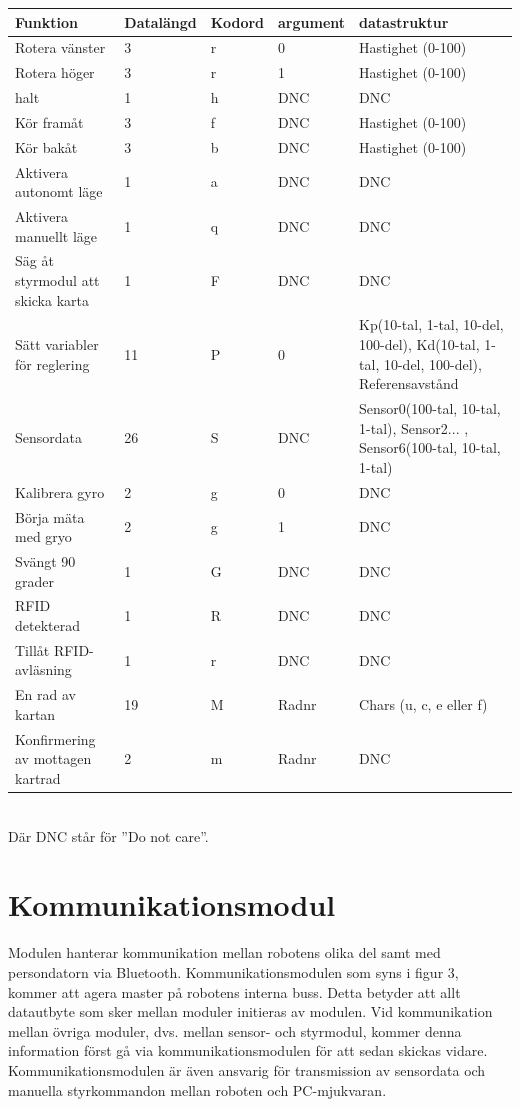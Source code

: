 \documentclass[a4paper,12pt,fleqn]{article}
\begin{document}
\begin{tabular}{| p{} | p{} | p{} | p{} | p{} |}
	\hline
	\rowcolor{listinggray}
	\textbf{Funktion} & \textbf{Datalängd} & \textbf{Kodord} & \textbf{argument} & \textbf{datastruktur} \\ \hline
	Rotera vänster & 3 & r & 0 & Hastighet (0-100) \\ \hline
	Rotera höger & 3 & r & 1 & Hastighet (0-100) \\ \hline
	halt & 1 & h & DNC & DNC \\ \hline
	Kör framåt & 3 & f & DNC & Hastighet (0-100) \\ \hline
	Kör bakåt & 3 & b & DNC & Hastighet (0-100) \\ \hline
	Aktivera autonomt läge & 1 & a & DNC & DNC \\ \hline
	Aktivera manuellt läge & 1 & q & DNC & DNC \\ \hline
	Säg åt styrmodul att skicka karta & 1 & F & DNC & DNC \\ \hline
	Sätt variabler för reglering & 11 & P & 0 & Kp(10-tal, 1-tal, 10-del, 100-del), Kd(10-tal, 1-tal, 10-del, 100-del), Referensavstånd \\ \hline
	Sensordata & 26 & S & DNC & Sensor0(100-tal, 10-tal, 1-tal), Sensor2... , Sensor6(100-tal, 10-tal, 1-tal) \\ \hline
	Kalibrera gyro & 2 & g & 0 & DNC \\ \hline
	Börja mäta med gryo & 2 & g & 1 & DNC \\ \hline
	Svängt 90 grader & 1 & G & DNC & DNC \\ \hline
	RFID detekterad & 1 & R & DNC & DNC \\ \hline
	Tillåt RFID-avläsning & 1 & r & DNC & DNC \\ \hline
	En rad av kartan & 19 & M & Radnr & Chars (u, c, e eller f) \\ \hline
	Konfirmering av mottagen kartrad & 2 & m & Radnr & DNC \\ \hline
\end{tabular}
~\\
Där DNC står för ''Do not care''.
\newpage


\section{Kommunikationsmodul}
Modulen hanterar kommunikation mellan robotens olika del samt med persondatorn via Bluetooth. Kommunikationsmodulen som syns i figur 3, kommer att agera master på robotens interna buss. Detta betyder att allt datautbyte som sker mellan moduler initieras av modulen. 
Vid kommunikation mellan övriga moduler, dvs. mellan sensor- och styrmodul, kommer denna information först gå via kommunikationsmodulen för att sedan skickas vidare.
Kommunikationsmodulen är även ansvarig för transmission av sensordata och manuella styrkommandon mellan roboten och PC-mjukvaran.
\end{document}
